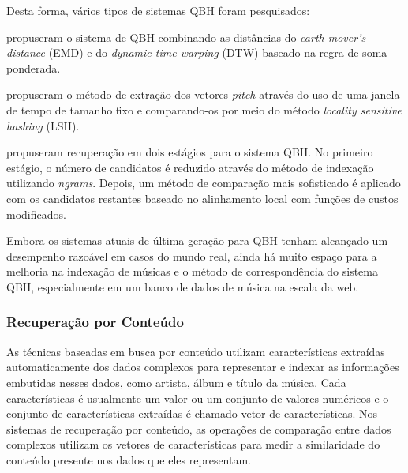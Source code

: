 Desta forma, vários tipos de sistemas QBH foram pesquisados:

 propuseram o sistema de QBH combinando as distâncias do \textit{earth mover’s distance} (EMD) e do \textit{dynamic time warping} (DTW) baseado na regra de soma ponderada.

 propuseram o método de extração dos vetores \textit{pitch} através do uso de uma janela de tempo de tamanho fixo e comparando-os por meio do método \textit{locality sensitive hashing} (LSH).

 propuseram recuperação em dois estágios para o sistema QBH. No primeiro estágio, o número de candidatos é reduzido através do método de indexação utilizando \textit{ngrams}. Depois, um método de comparação mais sofisticado é aplicado com os candidatos restantes baseado no alinhamento local com funções de custos modificados.

Embora os sistemas atuais de última geração para QBH tenham alcançado um desempenho razoável em casos do mundo real, ainda há muito espaço para a melhoria na indexação de músicas e o método de correspondência do sistema QBH, especialmente em um banco de dados de música na escala da web.

\subsubsection{Recuperação por Conteúdo} \label{conteudo}
As técnicas baseadas em busca por conteúdo utilizam características extraídas automaticamente dos dados complexos para representar e indexar as informações embutidas nesses dados, como artista, álbum e título da música. Cada características é usualmente um valor ou um conjunto de valores numéricos e o conjunto de características extraídas é chamado vetor de características. Nos sistemas de recuperação por conteúdo, as operações de comparação entre dados complexos utilizam os vetores de características para medir a similaridade do conteúdo presente nos dados que eles representam.

